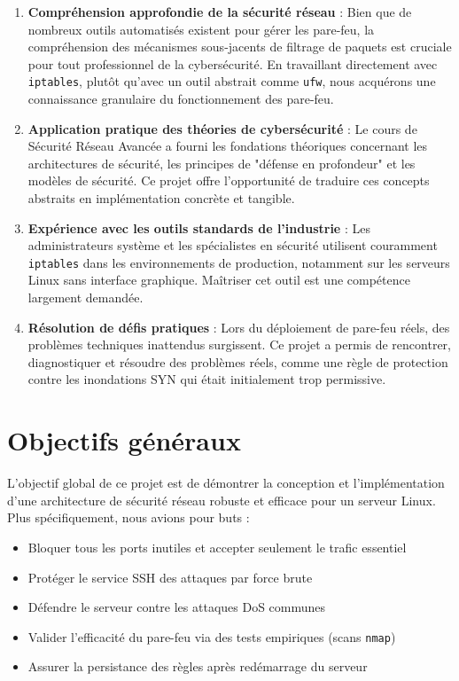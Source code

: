 \begin{enumerate}
    \item \textbf{Compréhension approfondie de la sécurité réseau} : Bien que de nombreux outils automatisés existent pour gérer les pare-feu, la compréhension des mécanismes sous-jacents de filtrage de paquets est cruciale pour tout professionnel de la cybersécurité. En travaillant directement avec \texttt{iptables}, plutôt qu'avec un outil abstrait comme \texttt{ufw}, nous acquérons une connaissance granulaire du fonctionnement des pare-feu.
    
    \item \textbf{Application pratique des théories de cybersécurité} : Le cours de Sécurité Réseau Avancée a fourni les fondations théoriques concernant les architectures de sécurité, les principes de "défense en profondeur" et les modèles de sécurité. Ce projet offre l'opportunité de traduire ces concepts abstraits en implémentation concrète et tangible.
    
    \item \textbf{Expérience avec les outils standards de l'industrie} : Les administrateurs système et les spécialistes en sécurité utilisent couramment \texttt{iptables} dans les environnements de production, notamment sur les serveurs Linux sans interface graphique. Maîtriser cet outil est une compétence largement demandée.
    
    \item \textbf{Résolution de défis pratiques} : Lors du déploiement de pare-feu réels, des problèmes techniques inattendus surgissent. Ce projet a permis de rencontrer, diagnostiquer et résoudre des problèmes réels, comme une règle de protection contre les inondations SYN qui était initialement trop permissive.
\end{enumerate}

\section{Objectifs généraux}

L'objectif global de ce projet est de démontrer la conception et l'implémentation d'une architecture de sécurité réseau robuste et efficace pour un serveur Linux. Plus spécifiquement, nous avions pour buts :

\begin{itemize}
    \item Bloquer tous les ports inutiles et accepter seulement le trafic essentiel
    \item Protéger le service SSH des attaques par force brute
    \item Défendre le serveur contre les attaques DoS communes
    \item Valider l'efficacité du pare-feu via des tests empiriques (scans \texttt{nmap})
    \item Assurer la persistance des règles après redémarrage du serveur
\end{itemize}

